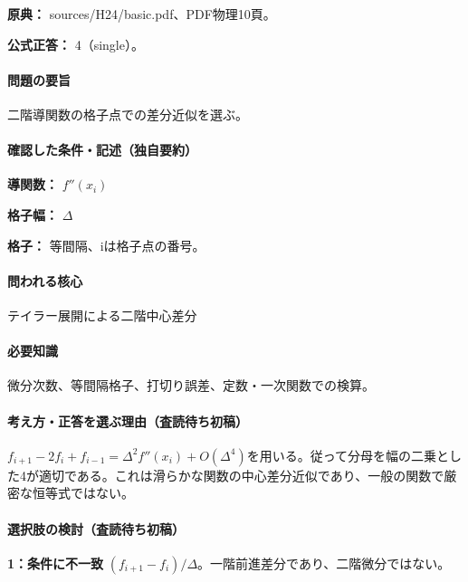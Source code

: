 \noindent\textbf{原典：} sources/H24/basic.pdf、PDF物理10頁。

\textbf{公式正答：} 4（single）。

\paragraph{問題の要旨} 二階導関数の格子点での差分近似を選ぶ。

\paragraph{確認した条件・記述（独自要約）}\mbox{}\par

\noindent\textbf{導関数：} \(f''(x_i)\)\par

\noindent\textbf{格子幅：} \(\Delta\)\par

\noindent\textbf{格子：} 等間隔、iは格子点の番号。\par

\paragraph{問われる核心} テイラー展開による二階中心差分

\paragraph{必要知識} 微分次数、等間隔格子、打切り誤差、定数・一次関数での検算。

\paragraph{考え方・正答を選ぶ理由（査読待ち初稿）} \(f_{i+1}-2f_i+f_{i-1}=\Delta^2f''(x_i)+O(\Delta^4)\)を用いる。従って分母を幅の二乗とした4が適切である。これは滑らかな関数の中心差分近似であり、一般の関数で厳密な恒等式ではない。

\paragraph{選択肢の検討（査読待ち初稿）}\mbox{}\par

\noindent\textbf{1：条件に不一致} \((f_{i+1}-f_i)/\Delta\)。一階前進差分であり、二階微分ではない。\par

